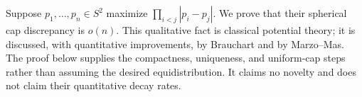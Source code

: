 Suppose $p_1,\ldots,p_n\in S^2$ maximize $\prod_{i<j}|p_i-p_j|$.
We prove that their spherical cap discrepancy is $o(n)$.
This qualitative fact is classical potential theory; it is discussed, with quantitative improvements, by Brauchart and by Marzo--Mas. The proof below supplies the compactness, uniqueness, and uniform-cap steps rather than assuming the desired equidistribution. It claims no novelty and does not claim their quantitative decay rates.
